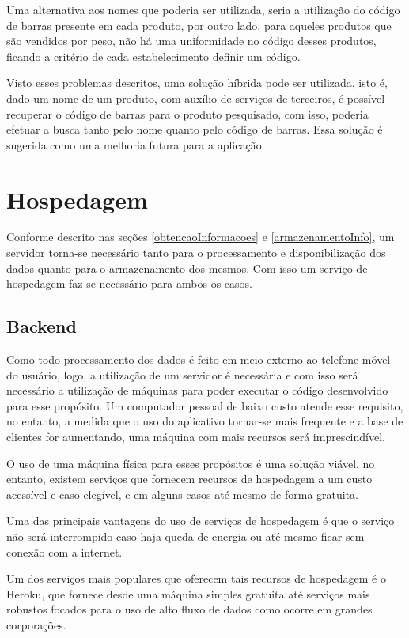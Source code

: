 Uma alternativa aos nomes que poderia ser utilizada, seria a utilização do código de barras presente em cada produto, por outro lado, para aqueles produtos que são vendidos por peso, não há uma uniformidade no código desses produtos, ficando a critério de cada estabelecimento definir um código.

Visto esses problemas descritos, uma solução híbrida pode ser utilizada, isto é, dado um nome de um produto, com auxílio de serviços de terceiros, é possível recuperar o código de barras para o produto pesquisado, com isso, poderia efetuar a busca tanto pelo nome quanto pelo código de barras. Essa solução é sugerida como uma melhoria futura para a aplicação.

\section{Hospedagem}

Conforme descrito nas seções \ref{obtencaoInformacoes} e \ref{armazenamentoInfo}, um servidor torna-se necessário tanto para o processamento e disponibilização dos dados quanto para o armazenamento dos mesmos. Com isso um serviço de hospedagem faz-se necessário para ambos os casos.

\subsection{Backend}

Como todo processamento dos dados é feito em meio externo ao telefone móvel do usuário, logo, a utilização de um servidor é necessária e com isso será necessário a utilização de máquinas para poder executar o código desenvolvido para esse propósito. Um computador pessoal de baixo custo atende esse requisito, no entanto, a medida que o uso do aplicativo tornar-se mais frequente e a base de clientes for aumentando, uma máquina com mais recursos será imprescindível.

O uso de uma máquina física para esses propósitos é uma solução viável, no entanto, existem serviços que fornecem recursos de hospedagem a um custo acessível e caso elegível, e em alguns casos até mesmo de forma gratuita.

Uma das principais vantagens do uso de serviços de hospedagem é que o serviço não será interrompido caso haja queda de energia ou até mesmo ficar sem conexão com a internet.

Um dos serviços mais populares que oferecem tais recursos de hospedagem é o Heroku\cite{heroku}, que fornece desde uma máquina simples gratuita até serviços mais robustos focados para o uso de alto fluxo de dados como ocorre em grandes corporações.

